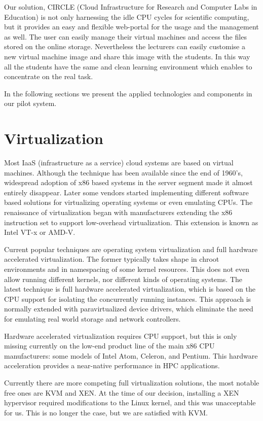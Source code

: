 \documentclass{llncs}
\begin{document}
Our solution, CIRCLE (Cloud Infrastructure for Research and Computer Labs in Education) is not only harnessing the idle CPU cycles for scientific computing, but it provides
an easy and flexible web-portal for the usage and the management as well. The user can easily manage their virtual machines and access the files stored on the online storage. Nevertheless the lecturers can easily customise a new virtual machine image and share this image with the students. In this way all the students have the same and clean learning environment which enables to concentrate on the real task. 

In the following sections we present the applied technologies and components in our pilot system. 

\section{Virtualization}
Most IaaS (infrastructure as a service) cloud systems are based on virtual machines. Although the technique has been available since the end of 1960's\cite{creasy1981origin}, widespread adoption of x86 based systems in the server segment made it almost entirely disappear. Later some vendors started implementing different software based solutions for virtualizing operating systems or even emulating CPUs. The renaissance of virtualization began with manufacturers extending the x86 instruction set to  support low-overhead virtualization. This extension is known as Intel VT-x or AMD-V.

Current popular techniques are operating system virtualization and full hardware accelerated virtualization. The former typically takes shape in chroot environments and in namespacing of some kernel resources. This does not even allow running different kernels, nor different kinds of operating systems. The latest technique is full hardware accelerated virtualization, which is based on the CPU support for isolating the concurrently running instances. This approach is normally extended with paravirtualized device drivers, which eliminate the need for emulating real world storage and network controllers.

Hardware accelerated virtualization requires CPU support, but this is only missing currently on the low-end product line of the main x86 CPU manufacturers: some models of Intel Atom, Celeron, and Pentium. This hardware acceleration provides a near-native performance in HPC applications.\cite{younge2011analysis}

Currently there are more competing full virtualization solutions, the most notable free ones are KVM and XEN. At the time of our decision, installing a XEN hypervisor required modifications to the Linux kernel, and this was unacceptable for us. This is no longer the case, but we are satisfied with KVM.
\end{document}
